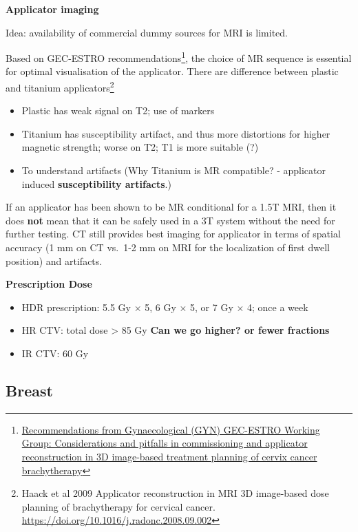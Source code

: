 \documentclass[]{book}
\providecommand{\tightlist}{%
  \setlength{\itemsep}{0pt}\setlength{\parskip}{0pt}}
\let\rmarkdownfootnote\footnote%
\def\footnote{\protect\rmarkdownfootnote}
\theoremstyle{definition}
\theoremstyle{definition}
\theoremstyle{definition}
\theoremstyle{remark}
\begin{document}
\textbf{Applicator imaging}

Idea: availability of commercial dummy sources for MRI is limited.

Based on GEC-ESTRO recommendations\footnote{\href{https://www.sciencedirect.com/science/article/pii/S0167814010003683}{Recommendations
  from Gynaecological (GYN) GEC-ESTRO Working Group: Considerations and
  pitfalls in commissioning and applicator reconstruction in 3D
  image-based treatment planning of cervix cancer brachytherapy}}, the
choice of MR sequence is essential for optimal visualisation of the
applicator. There are difference between plastic and titanium
applicators\footnote{Haack et al 2009 Applicator reconstruction in MRI
  3D image-based dose planning of brachytherapy for cervical cancer.
  \url{https://doi.org/10.1016/j.radonc.2008.09.002}}

\begin{itemize}
\tightlist
\item
  Plastic has weak signal on T2; use of markers
\item
  Titanium has susceptibility artifact, and thus more distortions for
  higher magnetic strength; worse on T2; T1 is more suitable (?)
\item
  To understand artifacts (Why Titanium is MR compatible? - applicator
  induced \textbf{susceptibility artifacts}.)
\end{itemize}

If an applicator has been shown to be MR conditional for a 1.5T MRI,
then it does \textbf{not} mean that it can be safely used in a 3T system
without the need for further testing. CT still provides best imaging for
applicator in terms of spatial accuracy (1 mm on CT vs.~1-2 mm on MRI
for the localization of first dwell position) and artifacts.

\textbf{Prescription Dose}

\begin{itemize}
\tightlist
\item
  HDR prescription: 5.5 Gy \(\times\) 5, 6 Gy \(\times\) 5, or 7 Gy
  \(\times\) 4; once a week
\item
  HR CTV: total dose \textgreater{} 85 Gy \textbf{Can we go higher? or
  fewer fractions}
\item
  IR CTV: 60 Gy
\end{itemize}

\subsection{Breast}\label{breast}
\end{document}
